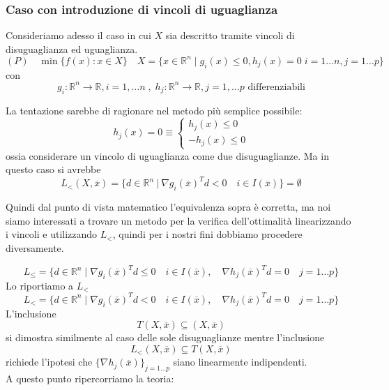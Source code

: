 \subsubsection{Caso con introduzione di vincoli di uguaglianza}
Consideriamo adesso il caso in cui $X$ sia descritto tramite
vincoli di disuguaglianza ed uguaglianza.
$$(P) \quad \min\{ f(x) : x \in X \} \quad
X = \{ x \in \mathbb{R}^{n} \; | \; g_i(x) \leq 0, h_j(x) = 0
\; i=1\ldots n, j =1 \ldots p
\}
$$
con
$$ g_i: \mathbb{R}^{n} \rightarrow \mathbb{R}, i=1, \ldots n \; , \;
h_j :  \mathbb{R}^{n} \rightarrow \mathbb{R}, j=1,\ldots p 
 \text{ differenziabili}
$$
\begin{notes}
La tentazione sarebbe di ragionare nel metodo pi\`u semplice possibile:
$$
 h_j(x) = 0 \equiv
\left\{
\begin{array}{l}
h_j(x) \leq 0 \\
- h_j(x) \leq 0
\end{array}
\right.
$$
ossia considerare un vincolo di uguaglianza come due disuguaglianze.
Ma in questo caso si avrebbe
$$
L_{<}(X, \overline{x}) = \{d \in \mathbb{R}^n ~|~ \nabla g_i(\overline{x})^Td <0 \quad i \in I(\overline{x})\} = \emptyset
$$

Quindi dal punto di vista matematico l'equivalenza sopra è corretta, ma noi siamo interessati a trovare un metodo per la verifica dell'ottimalità linearizzando i vincoli e utilizzando $L_<$, quindi per i nostri fini dobbiamo procedere diversamente.
\end{notes}

$$L_{\leq} =
\{ d \in \mathbb{R}^{n} \; | \; \nabla g_i(\overline{x})^{T} d \leq 0
\quad i \in I(\overline{x}),\quad \nabla h_j(\overline{x})^{T}d = 0
\quad j=1 \ldots p \}
$$
Lo riportiamo a $L_{<}$
$$L_{<} =
\{ d \in \mathbb{R}^{n} \; | \; \nabla g_i(\overline{x})^{T} d < 0
\quad i \in I(\overline{x}), \quad \nabla h_j(\overline{x})^{T}d = 0
\quad j=1 \ldots p \}
$$
L'inclusione 
$$T(X, \overline{x}) \subseteq (X, \overline{x})$$
si dimostra similmente al caso delle sole disuguaglianze
mentre l'inclusione 
$$ L_{<}(X, \overline{x}) \subseteq T(X, \overline{x})$$
richiede l'ipotesi che $\{ \nabla h_j(\overline{x})\}_{j=1\ldots p}$
siano linearmente indipendenti. \\
A questo punto ripercorriamo la teoria:

